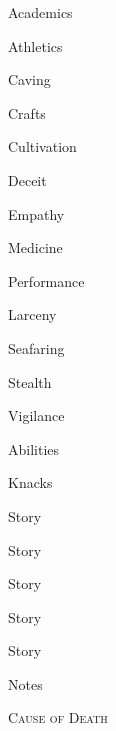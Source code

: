 \documentclass[10pt]{book}
\begin{document}
\pagebreak

\begin{multicols}{2}
  \parindent0pt
  \vspace{5mm}
  Academics\dotfill{}
  \par
  Athletics\dotfill{}
  \par
  Caving\dotfill{}
  \par
  Crafts\dotfill{}
  \par
  Cultivation\dotfill{}
  \par
  Deceit\dotfill{}
  \par
  Empathy\dotfill{}
  \par
  Medicine\dotfill{}
  \par
  Performance\dotfill{}
  \par
  Larceny\dotfill{}
  \par
  Seafaring\dotfill{}
  \par
  Stealth\dotfill{}
  \par
  Vigilance\dotfill{}
\end{multicols}

\medskip

\bigLine

Abilities

\pagebreak

Knacks

\pagebreak

Story \Square
\pagebreak

Story \Square
\pagebreak

Story \Square
\pagebreak

Story \Square
\pagebreak

Story \Square
\pagebreak

Notes
\pagebreak

\null
\pagebreak

\null

\pagebreak

\scshape\large
Cause of Death
\end{document}
